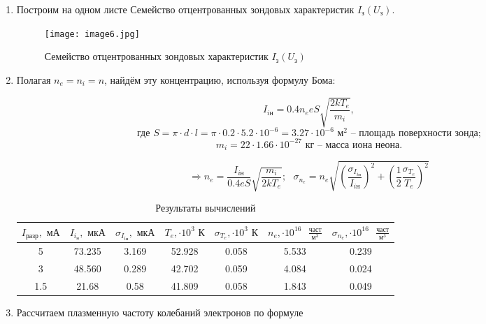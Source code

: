 \documentclass[a4paper,12pt]{article} %
\begin{document}
\begin{enumerate}
    \newpage

    \item Построим на одном листе Семейство отцентрованных зондовых характеристик $I_\text{з}(U_\text{з})$.
    \begin{figure}[h]
        \begin{center}
    		\texttt{[image: image6.jpg]}
        \end{center}
        \caption{Семейство отцентрованных зондовых характеристик $I_\text{з}(U_\text{з})$}
        \label{plot6}
    \end{figure}

    \item Полагая $n_e=n_i=n$, найдём эту концентрацию, используя формулу Бома:

    \[ I_{i\text{н}}=0.4n_{e}eS\sqrt{\frac{2kT_{e}}{m_{i}}}, \] \[ \text{ где } S=\pi\cdot d\cdot l = \pi \cdot 0.2 \cdot 5.2 \cdot 10^{-6} = 3.27 \cdot 10^{-6} \text{ м}^2 \text{ -- площадь поверхности зонда; } \] \[ m_{i} = 22\cdot 1.66 \cdot 10^{-27} \text{ кг -- масса иона неона.} \]

    \[ \Longrightarrow n_{e} = \frac{I_{i\text{н}}}{0.4eS}\sqrt{\frac{m_{i}}{2kT_{e}}}; \text{ } \sigma_{n_e} = n_e\sqrt{\left(\frac{\sigma_{I_{i\text{н}}}}{I_{i\text{н}}}\right)^2 + \left(\frac{1}{2}\frac{\sigma_{T_e}}{T_e}\right)^2} \]

    \begin{table}[h]
	\centering
	\begin{tabular}{|c|c|c|c|c|c|c|}
            \hline
            $I_{\text{разр}}, \text{ мА}$ & $I_{i_\text{н}}, \text{ мкА}$ & $\sigma_{I_{i\text{н}}}, \text{ мкА}$ & $T_e, \cdot 10^3 \text{ К}$ & $\sigma_{T_e}, \cdot 10^3 \text{ К}$ & $n_e, \cdot 10^{16} \text{ }\frac{\text{част}}{\text{м}^3}$ & $\sigma_{n_e}, \cdot 10^{16} \text{ }\frac{\text{част}}{\text{м}^3}$  \\ \hline
            5 & 73.235 & 3.169 & 52.928 & 0.058 & 5.533 & 0.239 \\ \hline
            3 & 48.560 & 0.289 & 42.702 & 0.059 & 4.084 & 0.024 \\ \hline
            1.5 & 21.68 & 0.58 & 41.809 & 0.058 & 1.843 & 0.049 \\ \hline
	\end{tabular}
	\caption{Результаты вычислений}
	\label{tab6}
    \end{table}

    \item Рассчитаем плазменную частоту колебаний электронов по формуле


\end{enumerate}
\end{document}
